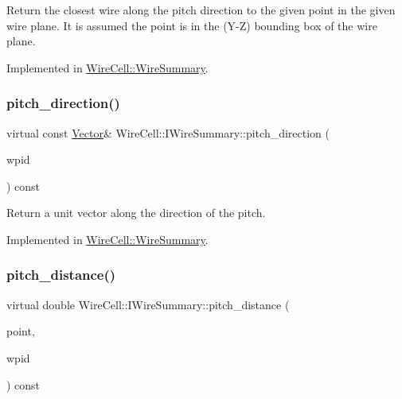 Return the closest wire along the pitch direction to the given point in the given wire plane. It is assumed the point is in the (Y-\/Z) bounding box of the wire plane. 

Implemented in \hyperlink{class_wire_cell_1_1_wire_summary_ad5b6996523e8d8a98fd0caec607fd9ad}{Wire\+Cell\+::\+Wire\+Summary}.

\mbox{\label{class_wire_cell_1_1_i_wire_summary_a7ed1cb880286717c269fa4fb9fcceec9}} 
\subsubsection{\texorpdfstring{pitch\+\_\+direction()}{pitch\_direction()}}
{\footnotesize\ttfamily virtual const \hyperlink{namespace_wire_cell_aa3c82d3ba85f032b0d278b7004846800}{Vector}\& Wire\+Cell\+::\+I\+Wire\+Summary\+::pitch\+\_\+direction (\begin{DoxyParamCaption}\item[{\hyperlink{class_wire_cell_1_1_wire_plane_id}{Wire\+Plane\+Id}}]{wpid }\end{DoxyParamCaption}) const\hspace{0.3cm}{\ttfamily [pure virtual]}}



Return a unit vector along the direction of the pitch. 



Implemented in \hyperlink{class_wire_cell_1_1_wire_summary_a0b38146487504f384c0a619db67f6e4a}{Wire\+Cell\+::\+Wire\+Summary}.

\mbox{\label{class_wire_cell_1_1_i_wire_summary_ac84fc8bf80d707050bda62b0dc9355fd}} 
\subsubsection{\texorpdfstring{pitch\+\_\+distance()}{pitch\_distance()}}
{\footnotesize\ttfamily virtual double Wire\+Cell\+::\+I\+Wire\+Summary\+::pitch\+\_\+distance (\begin{DoxyParamCaption}\item[{const \hyperlink{namespace_wire_cell_ab2b2565fa6432efbb4513c14c988cda9}{Point} \&}]{point,  }\item[{\hyperlink{class_wire_cell_1_1_wire_plane_id}{Wire\+Plane\+Id}}]{wpid }\end{DoxyParamCaption}) const\hspace{0.3cm}{\ttfamily [pure virtual]}}

